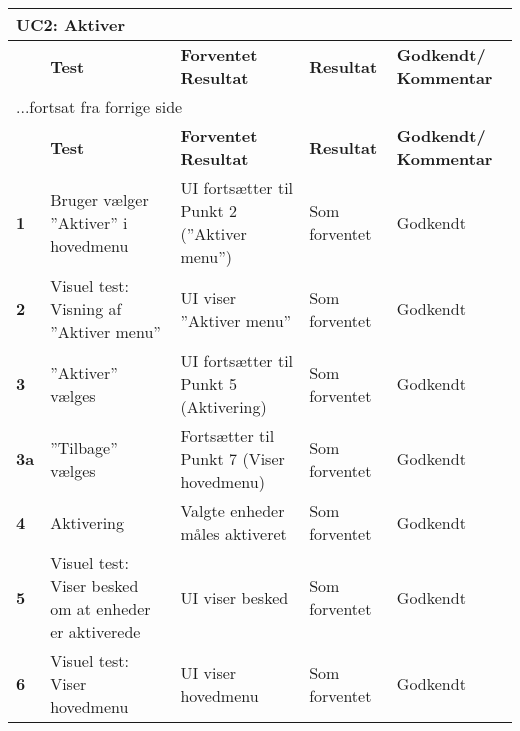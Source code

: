 
\begin{center}
\begin{longtable}{|p{}|p{}|p{}|p{}|p{}|} %
\hline
\multicolumn{5}{|l|}{\textbf{UC2: Aktiver}} \\ \hline
\multicolumn{1}{|c|}{} &
\textbf{Test} &
\textbf{Forventet \newline Resultat} &
\textbf{Resultat} &
\textbf{Godkendt/ \newline Kommentar} \\ \hline 
\endfirsthead

\multicolumn{5}{l}{...fortsat fra forrige side} \\ \hline 
\multicolumn{1}{|c|}{} &
\textbf{Test} &
\textbf{Forventet \newline Resultat} &
\textbf{Resultat} &
\textbf{Godkendt/ \newline Kommentar} \\ \hline 
\endhead

		
\textbf{1}			&Bruger vælger ''Aktiver'' i hovedmenu															
					&UI fortsætter til Punkt 2 (''Aktiver menu'')
					&Som \newline forventet 
					&Godkendt \\\hline
					
\textbf{2}			&Visuel test: Visning af ''Aktiver menu''																
					&UI viser ''Aktiver menu''
					&Som \newline forventet 
					&Godkendt \\\hline

\textbf{3}			&''Aktiver'' vælges			
					&UI fortsætter til Punkt 5 (Aktivering)
					&Som \newline forventet 
					&Godkendt \\\hline
					
\textbf{3a}			&''Tilbage'' vælges			
					&Fortsætter til Punkt 7 (Viser hovedmenu)
					&Som \newline forventet 
					&Godkendt \\\hline

\textbf{4}			&Aktivering			
					&Valgte enheder måles aktiveret
					&Som \newline forventet 
					&Godkendt \\\hline
		
\textbf{5}			&Visuel test: Viser besked om at enheder er aktiverede
					&UI viser besked
					&Som \newline forventet 
					&Godkendt \\\hline
					
\textbf{6}			&Visuel test: Viser hovedmenu
					&UI viser hovedmenu
					&Som \newline forventet 
					&Godkendt \\\hline

															
	\end{longtable}
	\label{ATUC2} 
\end{center}